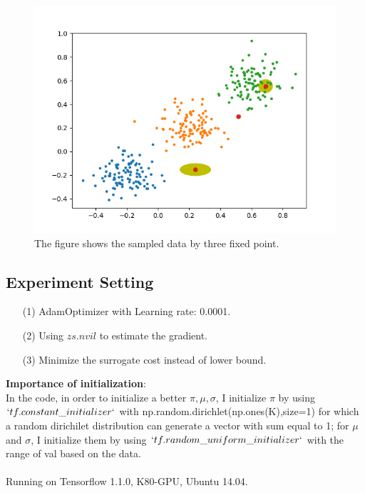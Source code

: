 \documentclass[a4paper]{article}
\begin{document}
\begin{figure}[!htbp]
\begin{center}
\includegraphics[width=14cm]{imgs/100_learn.png}
\end{center}
\caption{The figure shows the sampled data by three fixed point.}\label{datavis}
\end{figure}


\subsection{Experiment Setting}

\begin{enumerate}
\item[(1)] AdamOptimizer with Learning rate: 0.0001.
\item[(2)] Using $zs.nvil$ to estimate the gradient.
\item[(3)] Minimize the surrogate cost instead of lower bound.

\end{enumerate}

\textbf{Importance of initialization}:\\
In the code, in order to initialize a better $\pi, \mu, \sigma$, I initialize $\pi$ by using $`tf.constant\_initializer`$ with np.random.dirichlet(np.ones(K),size=1) for which a random dirichilet distribution can generate a vector with sum equal to 1; for $\mu$ and $\sigma$, I initialize them by using $`tf.random\_uniform\_initializer`$ with the range of val based on the data.
\\\\
Running on Tensorflow 1.1.0, K80-GPU, Ubuntu 14.04.
\end{document}
